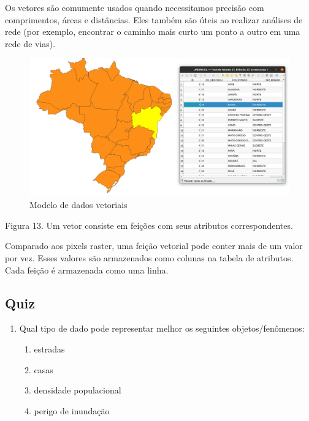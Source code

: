 \documentclass[
]{krantz}
\providecommand{\tightlist}{%
  \setlength{\itemsep}{0pt}\setlength{\parskip}{0pt}}
\begin{document}
Os vetores são comumente usados quando necessitamos precisão com comprimentos, áreas e distâncias. Eles também são úteis ao realizar análises de rede (por exemplo, encontrar o caminho mais curto um ponto a outro em uma rede de vias).

\begin{figure}
\centering
\includegraphics{media/modulo0/vector.png}
\caption{Modelo de dados vetoriais}
\end{figure}

Figura 13. Um vetor consiste em feições com seus atributos correspondentes.

Comparado aos pixels raster, uma feição vetorial pode conter mais de um valor por vez. Esses valores são armazenados como colunas na tabela de atributos. Cada feição é armazenada como uma linha.

\hypertarget{quiz-1}{%
\subsection{Quiz}\label{quiz-1}}

\begin{enumerate}
\def\labelenumi{\arabic{enumi}.}
\tightlist
\item
  Qual tipo de dado pode representar melhor os seguintes objetos/fenômenos:

  \begin{enumerate}
  \def\labelenumii{\arabic{enumii}.}
  \tightlist
  \item
    estradas
  \item
    casas
  \item
    densidade populacional
  \item
    perigo de inundação
  \end{enumerate}
\end{enumerate}
\end{document}
